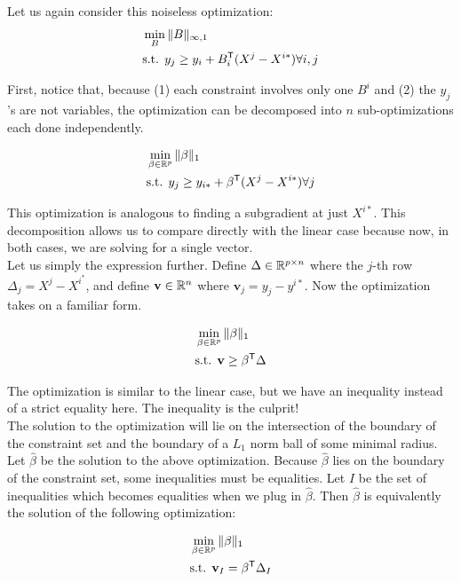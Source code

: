 \documentclass{article}
\begin{document}
Let us again consider this noiseless optimization:
\begin{align*}
& \min_B \| B \|_{\infty, 1}\\
&\textrm{s.t. } y_j \geq y_i + B_i^{\mathsf{T}} (X^j - X^{i*}) \forall i,j
\end{align*}

First, notice that, because (1) each constraint involves only one $B^i$ and (2) the $y_j$'s are not variables, the optimization can be decomposed into $n$ sub-optimizations each done independently. 

\begin{align*}
& \min_{\beta \in \mathbb{R}^p} \| \beta \|_{1}\\
&\textrm{s.t. } y_j \geq y_{i*} + \beta^{\mathsf{T}} (X^j - X^{i*}) \forall j
\end{align*}

This optimization is analogous to finding a subgradient at just $X^{i*}$. This decomposition allows us to compare directly with the linear case because now, in both cases, we are solving for a single vector.\\

Let us simply the expression further. Define $\Delta \in \mathbb{R}^{p \times n}$ where the $j$-th row $\Delta_j = X^j - X^{i^*}$, and define $\mathbf{v} \in \mathbb{R}^n$ where $\mathbf{v}_j = y_j - y^{i*}$. Now the optimization takes on a familiar form.

\begin{align*}
& \min_{\beta \in \mathbb{R}^p} \| \beta \|_{1}\\
&\textrm{s.t. } \mathbf{v} \geq \beta^{\mathsf{T}} \Delta
\end{align*}

The optimization is similar to the linear case, but we have an inequality instead of a strict equality here. The inequality is the culprit!\\

The solution to the optimization will lie on the intersection of the boundary of the constraint set and the boundary of a $L_1$ norm ball of some minimal radius. \\

Let $\hat{\beta}$ be the solution to the above optimization. Because $\hat{\beta}$ lies on the boundary of the constraint set, some inequalities must be equalities. Let $I$ be the set of inequalities which becomes equalities when we plug in $\hat{\beta}$. Then $\hat{\beta}$ is equivalently the solution of the following optimization:

\begin{align*}
& \min_{\beta \in \mathbb{R}^p} \| \beta \|_{1}\\
&\textrm{s.t. } \mathbf{v}_I = \beta^{\mathsf{T}} \Delta_I
\end{align*}
\end{document}
